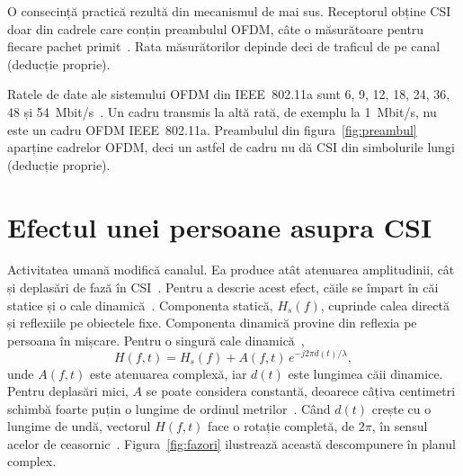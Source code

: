 O consecință practică rezultă din mecanismul de mai sus.
Receptorul obține CSI doar din cadrele care conțin preambulul OFDM, câte o măsurătoare pentru fiecare pachet primit~\cite[Sec.~2]{halperin2011}.
Rata măsurătorilor depinde deci de traficul de pe canal (deducție proprie).

Ratele de date ale sistemului OFDM din IEEE~802.11a sunt 6, 9, 12, 18, 24, 36, 48 și 54~Mbit/s~\cite[Sec.~17.1]{ieee80211a}.
Un cadru transmis la altă rată, de exemplu la 1~Mbit/s, nu este un cadru OFDM IEEE~802.11a.
Preambulul din figura~\ref{fig:preambul} aparține cadrelor OFDM, deci un astfel de cadru nu dă CSI din simbolurile lungi (deducție proprie).

\section{Efectul unei persoane asupra CSI}\label{sec:persoana}

Activitatea umană modifică canalul.
Ea produce atât atenuarea amplitudinii, cât și deplasări de fază în CSI~\cite[Sec.~3.1]{zhang2015antifall}.
Pentru a descrie acest efect, căile se împart în căi statice și o cale dinamică~\cite[p.~121:7]{zeng2019farsense}.
Componenta statică, $H_s(f)$, cuprinde calea directă și reflexiile pe obiectele fixe.
Componenta dinamică provine din reflexia pe persoana în mișcare.
Pentru o singură cale dinamică~\cite[ec.~(2)]{zeng2019farsense},
\begin{equation}\label{eq:static_dinamic}
	H(f, t) = H_s(f) + A(f, t)\, e^{-j2\pi d(t)/\lambda},
\end{equation}
unde $A(f,t)$ este atenuarea complexă, iar $d(t)$ este lungimea căii dinamice.
Pentru deplasări mici, $A$ se poate considera constantă, deoarece câțiva centimetri schimbă foarte puțin o lungime de ordinul metrilor~\cite[p.~121:7]{zeng2019farsense}.
Când $d(t)$ crește cu o lungime de undă, vectorul $H(f,t)$ face o rotație completă, de $2\pi$, în sensul acelor de ceasornic~\cite[p.~121:7]{zeng2019farsense}.
Figura~\ref{fig:fazori} ilustrează această descompunere în planul complex.


